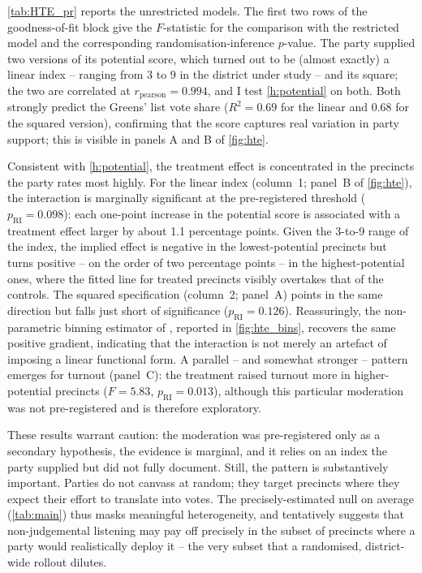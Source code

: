 \documentclass[11pt,a4paper]{scrartcl}
\begin{document}


\autoref{tab:HTE_pr} reports the unrestricted models. The first two rows of the goodness-of-fit block give the $F$-statistic for the comparison with the restricted model and the corresponding randomisation-inference $p$-value. The party supplied two versions of its potential score, which turned out to be (almost exactly) a linear index -- ranging from 3 to 9 in the district under study -- and its square; the two are correlated at $r_{\text{pearson}} = 0.994$, and I test \autoref{h:potential} on both. Both strongly predict the Greens' list vote share ($R^2 = 0.69$ for the linear and $0.68$ for the squared version), confirming that the score captures real variation in party support; this is visible in panels A and B of \autoref{fig:hte}.

Consistent with \autoref{h:potential}, the treatment effect is concentrated in the precincts the party rates most highly. For the linear index (column~1; panel~B of \autoref{fig:hte}), the interaction is marginally significant at the pre-registered threshold ($p_{\text{RI}} = 0.098$): each one-point increase in the potential score is associated with a treatment effect larger by about 1.1 percentage points. Given the 3-to-9 range of the index, the implied effect is negative in the lowest-potential precincts but turns positive -- on the order of two percentage points -- in the highest-potential ones, where the fitted line for treated precincts visibly overtakes that of the controls. The squared specification (column~2; panel~A) points in the same direction but falls just short of significance ($p_{\text{RI}} = 0.126$). Reassuringly, the non-parametric binning estimator of \textcite{hainmuellerHowMuchShould2019}, reported in \autoref{fig:hte_bins}, recovers the same positive gradient, indicating that the interaction is not merely an artefact of imposing a linear functional form. A parallel -- and somewhat stronger -- pattern emerges for turnout (panel~C): the treatment raised turnout more in higher-potential precincts ($F = 5.83$, $p_{\text{RI}} = 0.013$), although this particular moderation was not pre-registered and is therefore exploratory.

These results warrant caution: the moderation was pre-registered only as a secondary hypothesis, the evidence is marginal, and it relies on an index the party supplied but did not fully document. Still, the pattern is substantively important. Parties do not canvass at random; they target precincts where they expect their effort to translate into votes. The precisely-estimated null on average (\autoref{tab:main}) thus masks meaningful heterogeneity, and tentatively suggests that non-judgemental listening may pay off precisely in the subset of precincts where a party would realistically deploy it -- the very subset that a randomised, district-wide rollout dilutes.
\end{document}
